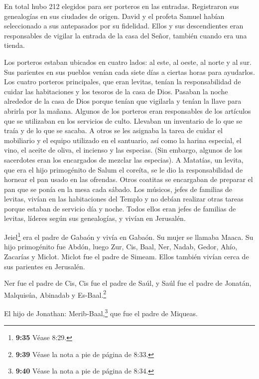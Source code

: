  En total hubo 212 elegidos para ser porteros en las
entradas. Registraron sus genealogías en sus ciudades de origen. David y
el profeta Samuel habían seleccionado a sus antepasados por su
fidelidad.  Ellos y sus descendientes eran responsables de
vigilar la entrada de la casa del Señor, también cuando era una tienda.

 Los porteros estaban ubicados en cuatro lados: al este, al
oeste, al norte y al sur.  Sus parientes en sus pueblos
venían cada siete días a ciertas horas para ayudarlos.  Los
cuatro porteros principales, que eran levitas, tenían la responsabilidad
de cuidar las habitaciones y los tesoros de la casa de Dios.
 Pasaban la noche alrededor de la casa de Dios porque
tenían que vigilarla y tenían la llave para abrirla por la mañana.
 Algunos de los porteros eran responsables de los artículos
que se utilizaban en los servicios de culto. Llevaban un inventario de
lo que se traía y de lo que se sacaba.  A otros se les
asignaba la tarea de cuidar el mobiliario y el equipo utilizado en el
santuario, así como la harina especial, el vino, el aceite de oliva, el
incienso y las especias.  (Sin embargo, algunos de los
sacerdotes eran los encargados de mezclar las especias).  A
Matatías, un levita, que era el hijo primogénito de Salum el coreíta, se
le dio la responsabilidad de hornear el pan usado en las ofrendas.
 Otros coatitas se encargaban de preparar el pan que se
ponía en la mesa cada sábado.  Los músicos, jefes de
familias de levitas, vivían en las habitaciones del Templo y no debían
realizar otras tareas porque estaban de servicio día y noche.
 Todos ellos eran jefes de familias de levitas, líderes
según sus genealogías, y vivían en Jerusalén.

 Jeiel\footnote{\textbf{9:35} Véase 8:29.} era el padre de
Gabaón y vivía en Gabaón. Su mujer se llamaba Maaca.  Su
hijo primogénito fue Abdón, luego Zur, Cis, Baal, Ner, Nadab,
 Gedor, Ahío, Zacarías y Miclot.  Miclot fue
el padre de Simeam. Ellos también vivían cerca de sus parientes en
Jerusalén.

 Ner fue el padre de Cis, Cis fue el padre de Saúl, y Saúl
fue el padre de Jonatán, Malquisúa, Abinadab y Es-Baal.\footnote{\textbf{9:39}
  Véase la nota a pie de página de 8:33.}

 El hijo de Jonathan: Merib-Baal,\footnote{\textbf{9:40}
  Véase la nota a pie de página de 8:34.} que fue el padre de Miqueas.

